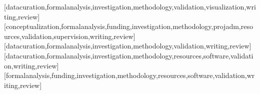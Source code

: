 \documentclass[portuguese]{textolivre}
\begin{document}
\begin{contributors}
[datacuration,formalanalysis,investigation,methodology,validation,visualization,writing,review]
[conceptualization,formalanalysis,funding,investigation,methodology,projadm,resources,validation,supervision,writing,review]
[datacuration,formalanalysis,investigation,methodology,validation,writing,review]
[datacuration,formalanalysis,investigation,methodology,resources,software,validation,writing,review]
[formalanalysis,funding,investigation,methodology,resources,software,validation,writing,review]
\end{contributors}
\end{document}
